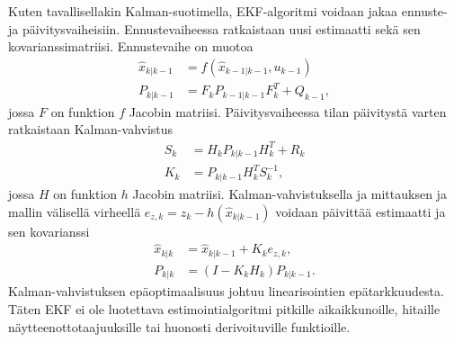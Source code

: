 Kuten tavallisellakin Kalman-suotimella, EKF-algoritmi voidaan jakaa ennuste- ja päivitysvaiheisiin. 
Ennustevaiheessa ratkaistaan uusi estimaatti sekä sen kovarianssimatriisi. Ennustevaihe on muotoa
\begin{align}
    \hat{x}_{k|k-1} &= f(\hat{x}_{k-1|k-1}, u_{k-1}) \\
    P_{k|k-1} &= F_k P_{k-1|k-1} F_k^T + Q_{k-1},
\end{align}
jossa \(F\) on funktion \(f\) Jacobin matriisi. 
Päivitysvaiheessa tilan päivitystä varten ratkaistaan Kalman-vahvistus
\begin{align}
    S_k &= H_k P_{k|k-1} H_k^T + R_k \\
    K_k &= P_{k|k-1} H_k^T S_k^{-1},
\end{align}
jossa \(H\) on funktion \(h\) Jacobin matriisi. 
Kalman-vahvistuksella ja mittauksen ja mallin välisellä virheellä  \(e_{z, k} = z_k - h(\hat{x}_{k|k-1}) \) 
voidaan päivittää estimaatti ja sen kovarianssi
\begin{align}
    \hat{x}_{k|k} &= \hat{x}_{k|k-1} + K_k e_{z, k}, \\
    P_{k|k} &= (I-K_k H_k) P_{k|k-1}.
\end{align}
Kalman-vahvistuksen epäoptimaalisuus johtuu linearisointien epätarkkuudesta. Täten EKF ei ole luotettava estimointialgoritmi pitkille aikaikkunoille, hitaille näytteenottotaajuuksille tai huonosti derivoituville funktioille.